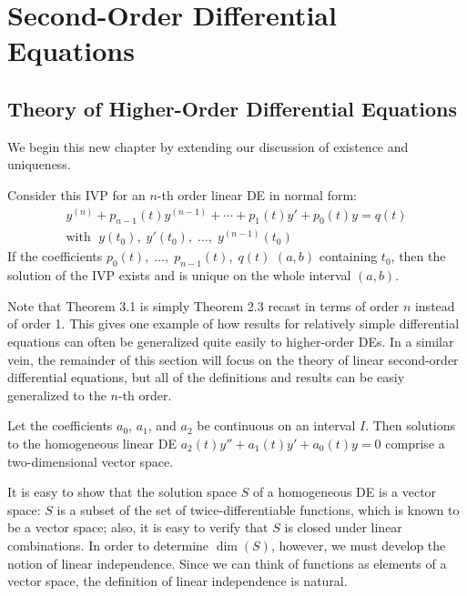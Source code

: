 \documentclass[../m82main.tex]{subfiles}
\begin{document}
\chapter{Second-Order Differential Equations}

\section{Theory of Higher-Order Differential Equations}
We begin this new chapter by extending our discussion of existence and uniqueness.

\begin{theorem}
    Consider this IVP for an $n$-th order linear DE in normal form:
    \begin{gather*}
        y^{(n)} + p_{n-1}(t)y^{(n-1)} + \cdots + p_1(t)y' + p_0(t)y = q(t) \\
        \text{with }\; y(t_0),\; y'(t_0),\; \ldots,\; y^{(n-1)}(t_0)
    \end{gather*}
    If the coefficients $p_0(t),\; \ldots,\; p_{n-1}(t),\; q(t)$  $(a, b)$ containing $t_0$, then the solution of the IVP exists and is unique on the whole interval $(a, b)$.
\end{theorem}

Note that Theorem 3.1 is simply Theorem 2.3 recast in terms of order $n$ instead of order 1.
This gives one example of how results for relatively simple differential equations can often be generalized quite easily to higher-order DEs.
In a similar vein, the remainder of this section will focus on the theory of linear second-order differential equations, but all of the definitions and results can be easiy generalized to the $n$-th order.

\begin{theorem}
    Let the coefficients $a_0$, $a_1$, and $a_2$ be continuous on an interval $I$.
    Then solutions to the homogeneous linear DE $a_2(t)y'' + a_1(t)y' + a_0(t)y = 0$ comprise a two-dimensional vector space.
\end{theorem}

It is easy to show that the solution space $S$ of a homogeneous DE is a vector space: $S$ is a subset of the set of twice-differentiable functions, which is known to be a vector space; also, it is easy to verify that $S$ is closed under linear combinations.
In order to determine $\dim (S)$, however, we must develop the notion of linear independence.
Since we can think of functions as elements of a vector space, the definition of linear independence is natural.
\end{document}
